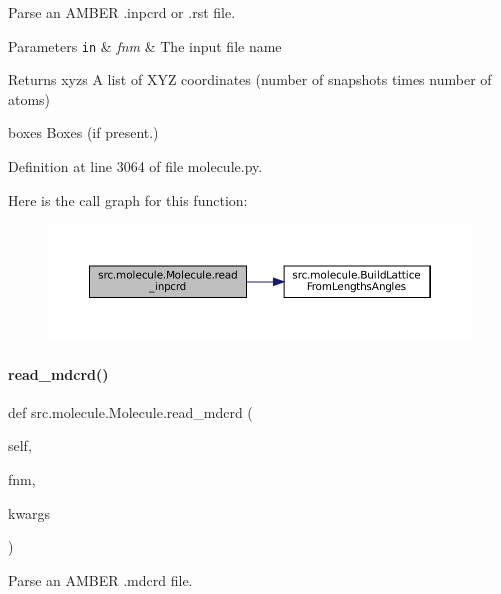 Parse an A\+M\+B\+ER .inpcrd or .rst file. 


\begin{DoxyParams}[1]{Parameters}
\mbox{\tt in}  & {\em fnm} & The input file name \\
\hline
\end{DoxyParams}
\begin{DoxyReturn}{Returns}
xyzs A list of X\+YZ coordinates (number of snapshots times number of atoms) 

boxes Boxes (if present.) 
\end{DoxyReturn}


Definition at line 3064 of file molecule.\+py.

Here is the call graph for this function\+:
\nopagebreak
\begin{figure}[H]
\begin{center}
\leavevmode
\includegraphics[width=350pt]{classsrc_1_1molecule_1_1Molecule_a25e54248bd35147e2c2aa210d06a58a5_cgraph}
\end{center}
\end{figure}
\mbox{\label{classsrc_1_1molecule_1_1Molecule_aa7a40df32ff22ef52b902ac6a24dcb50}} 
\paragraph{\texorpdfstring{read\+\_\+mdcrd()}{read\_mdcrd()}}
{\footnotesize\ttfamily def src.\+molecule.\+Molecule.\+read\+\_\+mdcrd (\begin{DoxyParamCaption}\item[{}]{self,  }\item[{}]{fnm,  }\item[{}]{kwargs }\end{DoxyParamCaption})}



Parse an A\+M\+B\+ER .mdcrd file. 

